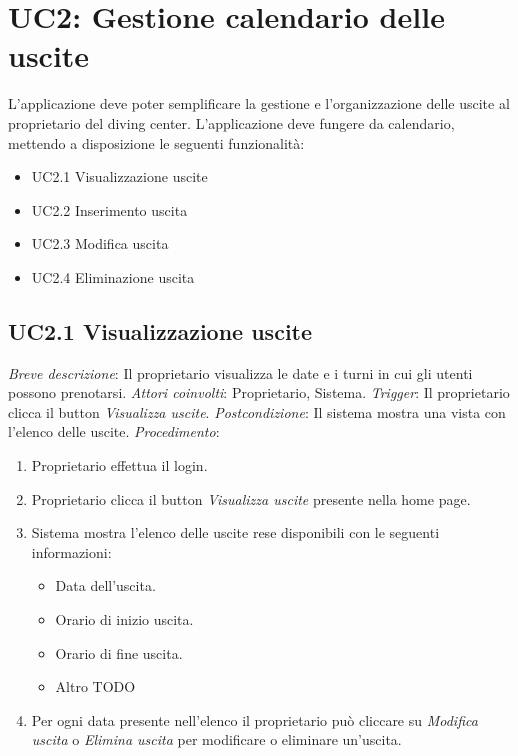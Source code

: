 \section{UC2: Gestione calendario delle uscite}
L'applicazione deve poter semplificare la gestione e l'organizzazione delle uscite al proprietario del diving center.
L'applicazione deve fungere da calendario, mettendo a disposizione le seguenti funzionalità:

\begin{itemize}
    \item UC2.1 Visualizzazione uscite
    \item UC2.2 Inserimento uscita
    \item UC2.3 Modifica uscita
    \item UC2.4 Eliminazione uscita
\end{itemize}

\subsection{UC2.1 Visualizzazione uscite}

\noindent \emph{Breve descrizione}: Il proprietario visualizza le date e i turni in cui gli utenti possono prenotarsi.\medbreak
\noindent \emph{Attori coinvolti}: Proprietario, Sistema.\medbreak
\noindent \emph{Trigger}: Il proprietario clicca il button \textit{Visualizza uscite}.\medbreak
\noindent \emph{Postcondizione}: Il sistema mostra una vista con l'elenco delle uscite.\medbreak
\noindent \emph{Procedimento}:

\begin{enumerate}
    \item Proprietario effettua il login.
    \item Proprietario clicca il button \textit{Visualizza uscite} presente nella home page.
    \item Sistema mostra l'elenco delle uscite rese disponibili con le seguenti informazioni:
          \begin{itemize}
              \item Data dell'uscita.
              \item Orario di inizio uscita.
              \item Orario di fine uscita.
              \item Altro TODO
          \end{itemize}
    \item Per ogni data presente nell'elenco il proprietario può cliccare su \textit{Modifica uscita} o \textit{Elimina uscita} per modificare o eliminare un'uscita.
\end{enumerate}

